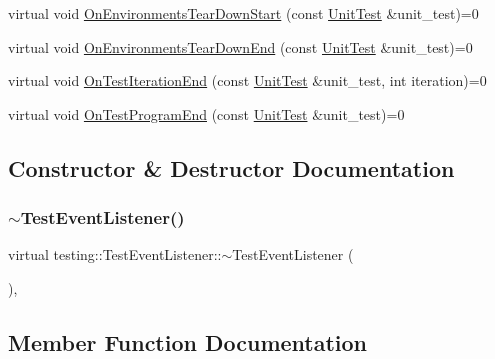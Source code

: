 \begin{DoxyCompactItemize}
\item 
virtual void \hyperlink{classtesting_1_1_test_event_listener_a468b5e6701bcb86cb2c956caadbba5e4}{On\+Environments\+Tear\+Down\+Start} (const \hyperlink{classtesting_1_1_unit_test}{Unit\+Test} \&unit\+\_\+test)=0
\item 
virtual void \hyperlink{classtesting_1_1_test_event_listener_a9ea04fa7f447865ba76df35e12ba2092}{On\+Environments\+Tear\+Down\+End} (const \hyperlink{classtesting_1_1_unit_test}{Unit\+Test} \&unit\+\_\+test)=0
\item 
virtual void \hyperlink{classtesting_1_1_test_event_listener_a550fdb3e55726e4cefa09f5697941425}{On\+Test\+Iteration\+End} (const \hyperlink{classtesting_1_1_unit_test}{Unit\+Test} \&unit\+\_\+test, int iteration)=0
\item 
virtual void \hyperlink{classtesting_1_1_test_event_listener_ad15b6246d94c268e233487a86463ef3d}{On\+Test\+Program\+End} (const \hyperlink{classtesting_1_1_unit_test}{Unit\+Test} \&unit\+\_\+test)=0
\end{DoxyCompactItemize}


\subsection{Constructor \& Destructor Documentation}
\mbox{\label{classtesting_1_1_test_event_listener_a4512d19e7a108ec4926239ec1ea85d63}} 
\subsubsection{\texorpdfstring{$\sim$\+Test\+Event\+Listener()}{~TestEventListener()}}
{\footnotesize\ttfamily virtual testing\+::\+Test\+Event\+Listener\+::$\sim$\+Test\+Event\+Listener (\begin{DoxyParamCaption}{ }\end{DoxyParamCaption})\hspace{0.3cm}{\ttfamily [inline]}, {\ttfamily [virtual]}}



\subsection{Member Function Documentation}
\mbox{\label{classtesting_1_1_test_event_listener_aaa1021d75f5dbf3f05c829c1cc520341}} 
